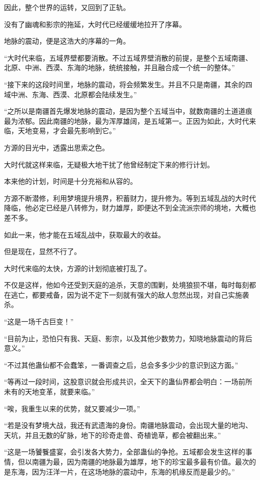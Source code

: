 \begin{this_body}
因此，整个世界的运转，又回到了正轨。

没有了幽魂和影宗的拖延，大时代已经缓缓地拉开了序幕。

地脉的震动，便是这浩大的序幕的一角。

“大时代来临，五域界壁都要消散。不过五域界壁消散的前提，是整个五域南疆、北原、中洲、西漠、东海的地脉，统统接触，并且融合成一个统一的整体。”

“接下来的这段时间里，地脉的震动，将会频繁发生。并且不只是南疆，其余的四域中洲、东海、西漠、北原都会陆续发生。”

“之所以是南疆首先爆发地脉的震动，是因为整个五域当中，就数南疆的土道道痕最为浓郁。因此南疆的地脉，最为浑厚雄阔，是五域第一。正因为如此，大时代来临，天地变易，才会最先影响到它。”

方源的目光中，透露出思索之色。

大时代就这样来临，无疑极大地干扰了他曾经制定下来的修行计划。

本来他的计划，时间是十分充裕和从容的。

方源不断潜修，利用梦境提升境界，积蓄财力，提升修为。等到五域乱战的大时代降临，他必定已经是八转修为，财力雄厚，即便达不到全流派宗师的境地，大概也差不多。

如此一来，他才能在五域乱战中，获取最大的收益。

但是现在，显然不行了。

大时代来临的太快，方源的计划彻底被打乱了。

不仅是这样，他如今还受到天庭的追杀，天意的围剿，处境狼狈不堪，每时每刻都在逃亡，都要戒备，因为说不定下一刻就有强大的敌人忽然出现，对自己实施袭杀。

“这是一场千古巨变！”

“目前为止，恐怕只有我、天庭、影宗，以及其他少数势力，知晓地脉震动的背后意义。”

“不过其他蛊仙都不会蠢笨，一番调查之后，总会多多少少的意识到这方面。”

“等再过一段时间，这股意识就会形成共识，全天下的蛊仙界都会明白：一场前所未有的天地变革，就要来临。”

“唉，我重生以来的优势，就又要减少一项。”

“若是没有梦境大战，我还有武遗海的身份。南疆地脉震动，会出现大量的地沟、天坑，并且无数的矿脉，地下的珍奇走兽、奇植诡草，都会被翻出来。”

“这是一场饕餮盛宴，会引发各大势力，全部蛊仙的争抢。五域都会发生这样的事情，但以南疆为最，因为南疆的地脉最为雄厚，地下的珍宝最多最有价值。最次的是东海，因为汪洋一片，在这场地脉的震动中，东海的机缘反而是最少的。”


\end{this_body}
